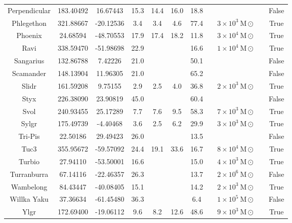 \begin{table}
\begin{tabular}{ccccccccccc}
Perpendicular & 183.40492 & 16.67443 & 15.3 & 14.4 & 16.0 & 18.8 & \citet{weiss:2018} & &  & False \\
Phlegethon & 321.88667 & -20.12536 & 3.4 & 3.4 & 4.6 & 77.4 & \citet{ibata:2023} & $3 \times 10^{3}~\mathrm{M}\odot$ &  & True \\
Phoenix & 24.68594 & -48.70553 & 17.9 & 17.4 & 18.2 & 11.8 & \citet{shipp:2019} & $3 \times 10^{4}~\mathrm{M}\odot$ & \citet{shipp:2018} & True \\
Ravi & 338.59470 & -51.98698 & 22.9 & & & 16.6 & \citet{shipp:2018} & $1 \times 10^{4}~\mathrm{M}\odot$ & \citet{shipp:2018} & True \\
Sangarius & 132.86788 & 7.42226 & 21.0 & & & 50.1 & \citet{grillmair:2017} & &  & False \\
Scamander & 148.13904 & 11.96305 & 21.0 & & & 65.2 & \citet{grillmair:2017} & &  & False \\
Slidr & 161.59208 & 9.75155 & 2.9 & 2.5 & 4.0 & 36.8 & \citet{ibata:2023} & $2 \times 10^{3}~\mathrm{M}\odot$ &  & True \\
Styx & 226.38090 & 23.90819 & 45.0 & & & 60.4 & \citet{grillmair:2009} & &  & False \\
Svol & 240.93455 & 25.17289 & 7.7 & 7.6 & 9.5 & 58.3 & \citet{ibata:2023} & $7 \times 10^{3}~\mathrm{M}\odot$ &  & True \\
Sylgr & 175.49739 & -4.40468 & 3.6 & 2.5 & 6.2 & 29.9 & \citet{ibata:2023} & $3 \times 10^{3}~\mathrm{M}\odot$ &  & True \\
Tri-Pis & 22.50186 & 29.49423 & 26.0 & & & 13.5 & \citet{bonaca:2012} & &  & False \\
Tuc3 & 355.95672 & -59.57092 & 24.4 & 19.1 & 33.6 & 16.7 & \citet{ibata:2023} & $8 \times 10^{4}~\mathrm{M}\odot$ &  & True \\
Turbio & 27.94110 & -53.50001 & 16.6 & & & 15.0 & \citet{shipp:2018} & $4 \times 10^{3}~\mathrm{M}\odot$ & \citet{shipp:2018} & True \\
Turranburra & 67.14116 & -22.46357 & 26.3 & & & 13.7 & \citet{shipp:2019} & $2 \times 10^{6}~\mathrm{M}\odot$ & \citet{shipp:2018} & False \\
Wambelong & 84.43447 & -40.08405 & 15.1 & & & 14.2 & \citet{shipp:2018} & $2 \times 10^{3}~\mathrm{M}\odot$ & \citet{shipp:2018} & True \\
Willka Yaku & 37.36634 & -61.45480 & 36.3 & & & 6.4 & \citet{shipp:2018} & $1 \times 10^{5}~\mathrm{M}\odot$ & \citet{shipp:2018} & False \\
Ylgr & 172.69400 & -19.06112 & 9.6 & 8.2 & 12.6 & 48.6 & \citet{ibata:2023} & $9 \times 10^{3}~\mathrm{M}\odot$ &  & True \\
\end{tabular}
\end{table}

